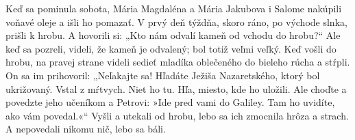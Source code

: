 Keď sa pominula sobota, Mária Magdaléna a Mária Jakubova i Salome nakúpili voňavé oleje a išli ho pomazať. V prvý deň týždňa, skoro ráno, po východe slnka, prišli k hrobu. 
\versseparator
A hovorili si: „Kto nám odvalí kameň od vchodu do hrobu?“ Ale keď sa pozreli, videli, že kameň je odvalený; bol totiž veľmi veľký. 
\versseparator
Keď vošli do hrobu, na pravej strane videli sedieť mladíka oblečeného do bieleho rúcha a stŕpli. 
\versseparator
On sa im prihovoril: „Neľakajte sa! Hľadáte Ježiša Nazaretského, ktorý bol ukrižovaný. Vstal z mŕtvych. Niet ho tu. Hľa, miesto, kde ho uložili. Ale choďte a povedzte jeho učeníkom a Petrovi: »Ide pred vami do Galiley. Tam ho uvidíte, ako vám povedal.«“ 
\versseparator
Vyšli a utekali od hrobu, lebo sa ich zmocnila hrôza a strach. A nepovedali nikomu nič, lebo sa báli. 
